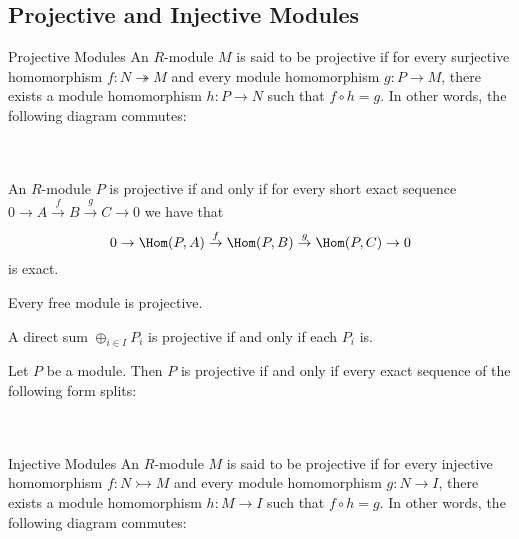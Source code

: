 \documentclass[a4paper]{article}
\begin{document}
\subsection{Projective and Injective Modules}
\begin{defn}{Projective Modules}{} An $R$-module $M$ is said to be projective if for every surjective homomorphism $f:N\twoheadrightarrow M$ and every module homomorphism $g:P\to M$, there exists a module homomorphism $h:P\to N$ such that $f\circ h=g$. In other words, the following diagram commutes: \\~\\
 \\
\end{defn}

\begin{thm}{}{} An $R$-module $P$ is projective if and only if for every short exact sequence $0\to A\overset{f}{\to}B\overset{g}{\to}C\to 0$ we have that $$0\to \Hom(P,A)\overset{f}{\to}\Hom(P,B)\overset{g}{\to}\Hom(P,C)\to 0$$
is exact. 
\end{thm}

\begin{lmm}{}{} Every free module is projective. 
\end{lmm}

\begin{prp}{}{} A direct sum $\oplus_{i\in I}P_i$ is projective if and only if each $P_i$ is. 
\end{prp}

\begin{prp}{}{} Let $P$ be a module. Then $P$ is projective if and only if every exact sequence of the following form splits: \\~\\
 \\
\end{prp}

\begin{defn}{Injective Modules}{} An $R$-module $M$ is said to be projective if for every injective homomorphism $f:N\rightarrowtail M$ and every module homomorphism $g:N\to I$, there exists a module homomorphism $h:M\to I$ such that $f\circ h=g$. In other words, the following diagram commutes: \\~\\
 \\
\end{defn}
\end{document}
